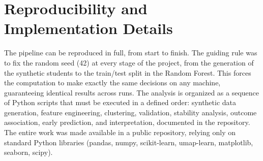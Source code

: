 \section{Reproducibility and Implementation Details}
\label{sec:reproducibility}
The pipeline can be reproduced in full, from start to finish. The guiding rule was to fix the random seed (42) at every stage of the project, from the generation of the synthetic students to the train/test split in the Random Forest. This forces the computation to make exactly the same decisions on any machine, guaranteeing identical results across runs. The analysis is organized as a sequence of Python scripts that must be executed in a defined order: synthetic data generation, feature engineering, clustering, validation, stability analysis, outcome association, early prediction, and interpretation, documented in the repository. The entire work was made available in a public repository, relying only on standard Python libraries (pandas, numpy, scikit-learn, umap-learn, matplotlib, seaborn, scipy).